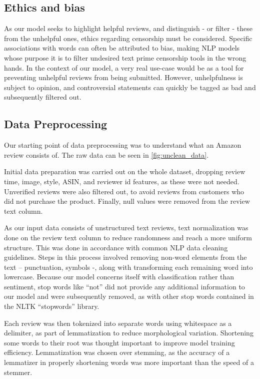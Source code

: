 \documentclass[twoside,twocolumn]{article}
\begin{document}
\subsection{Ethics and bias}
As our model seeks to highlight helpful reviews, and distinguish - or filter - these from the unhelpful ones, ethics regarding censorship must be considered. Specific associations with words can often be attributed to bias, making NLP models whose purpose it is to filter undesired text prime censorship tools in the wrong hands\cite{censorship}. In the context of our model, a very real use-case would be as a tool for preventing unhelpful reviews from being submitted. However, unhelpfulness is subject to opinion, and controversial statements can quickly be tagged as bad and subsequently filtered out.

\subsection{Data Preprocessing}

Our starting point of data preprocessing was to understand what an Amazon review consists of. The raw data can be seen in \figurename{\ref{fig:unclean_data}}.

Initial data preparation was carried out on the whole dataset, dropping review time, image, style, ASIN, and reviewer id features, as these were not needed. Unverified reviews were also filtered out, to avoid reviews from customers who did not purchase the product. Finally, null values were removed from the review text column.

As our input data consists of unstructured text reviews, text normalization was done on the review text column to reduce randomness and reach a more uniform structure. This was done in accordance with common NLP data cleaning guidelines\cite{NLP}. Steps in this process involved removing non-word elements from the text – punctuation, symbols -, along with transforming each remaining word into lowercase. Because our model concerns itself with classification rather than sentiment, stop words like “not” did not provide any additional information to our model and were subsequently removed, as with other stop words contained in the NLTK “stopwords” library.

Each review was then tokenized into separate words using whitespace as a delimiter, as part of lemmatization to reduce morphological variation. Shortening some words to their root was thought important to improve model training efficiency. Lemmatization was chosen over stemming, as the accuracy of a lemmatizer in properly shortening words was more important than the speed of a stemmer.
\end{document}
